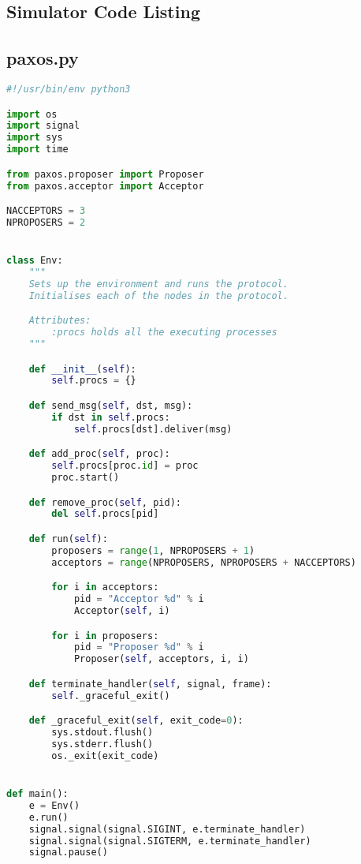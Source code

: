 \begin{landscape}

\chapter{Simulator Code Listing}
\begin{multicols*}{2}

\section{paxos.py}
\begin{lstlisting}[language=Python]
#!/usr/bin/env python3

import os
import signal
import sys
import time

from paxos.proposer import Proposer
from paxos.acceptor import Acceptor

NACCEPTORS = 3
NPROPOSERS = 2


class Env:
    """
    Sets up the environment and runs the protocol.
    Initialises each of the nodes in the protocol.

    Attributes:
        :procs holds all the executing processes
    """

    def __init__(self):
        self.procs = {}

    def send_msg(self, dst, msg):
        if dst in self.procs:
            self.procs[dst].deliver(msg)

    def add_proc(self, proc):
        self.procs[proc.id] = proc
        proc.start()

    def remove_proc(self, pid):
        del self.procs[pid]

    def run(self):
        proposers = range(1, NPROPOSERS + 1)
        acceptors = range(NPROPOSERS, NPROPOSERS + NACCEPTORS)

        for i in acceptors:
            pid = "Acceptor %d" % i
            Acceptor(self, i)

        for i in proposers:
            pid = "Proposer %d" % i
            Proposer(self, acceptors, i, i)

    def terminate_handler(self, signal, frame):
        self._graceful_exit()

    def _graceful_exit(self, exit_code=0):
        sys.stdout.flush()
        sys.stderr.flush()
        os._exit(exit_code)


def main():
    e = Env()
    e.run()
    signal.signal(signal.SIGINT, e.terminate_handler)
    signal.signal(signal.SIGTERM, e.terminate_handler)
    signal.pause()



\end{lstlisting}
\end{multicols*}
\end{landscape}

